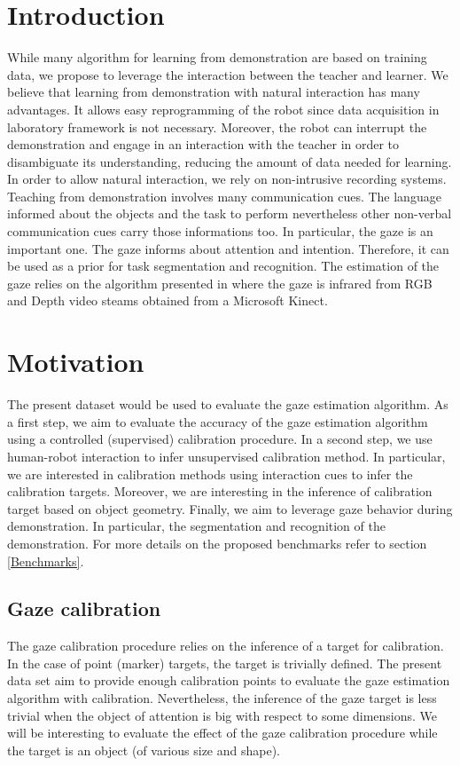 \documentclass[11pt,a4paper]{article}
\begin{document}
\section{Introduction}
While many algorithm for learning from demonstration are based on training data, we propose to leverage the interaction between the teacher and learner. We believe that learning from demonstration with natural interaction has many advantages. It allows easy reprogramming of the robot since data acquisition in laboratory framework is not necessary. Moreover, the robot can interrupt the demonstration and engage in an interaction with the teacher in order to disambiguate its understanding, reducing the amount of data needed for learning.
\newline
In order to allow natural interaction, we rely on non-intrusive recording systems. Teaching from demonstration involves many communication cues. The language informed about the objects and the task to perform nevertheless other non-verbal communication cues carry those informations too. In particular, the gaze is an important one. 
\newline
The gaze informs about attention and intention. Therefore, it can be used as a prior for task segmentation and recognition. The estimation of the gaze relies on the algorithm presented in \cite{Funes2016} where the gaze is infrared from RGB and Depth video steams obtained from a Microsoft Kinect.

\section{Motivation}
The present dataset would be used to evaluate the gaze estimation algorithm. As a first step, we aim to evaluate the accuracy of the gaze estimation algorithm using a controlled (supervised) calibration procedure. In a second step, we use human-robot interaction to infer unsupervised calibration method. In particular, we are interested in calibration methods using interaction cues to infer the calibration targets. Moreover, we are interesting in the inference of calibration target based on object geometry. Finally, we aim to leverage gaze behavior during demonstration. In particular, the segmentation and recognition of the demonstration. For more details on the proposed benchmarks refer to section \ref{Benchmarks}.
\subsection{Gaze calibration}
The gaze calibration procedure relies on the inference of a target for calibration. In the case of point (marker) targets, the target is trivially defined. The present data set aim to provide enough calibration points to evaluate the gaze estimation algorithm with calibration. Nevertheless, the inference of the gaze target is less trivial when the object of attention is big with respect to some dimensions. We will be interesting to evaluate the effect of the gaze calibration procedure while the target is an object (of various size and shape).
\end{document}
